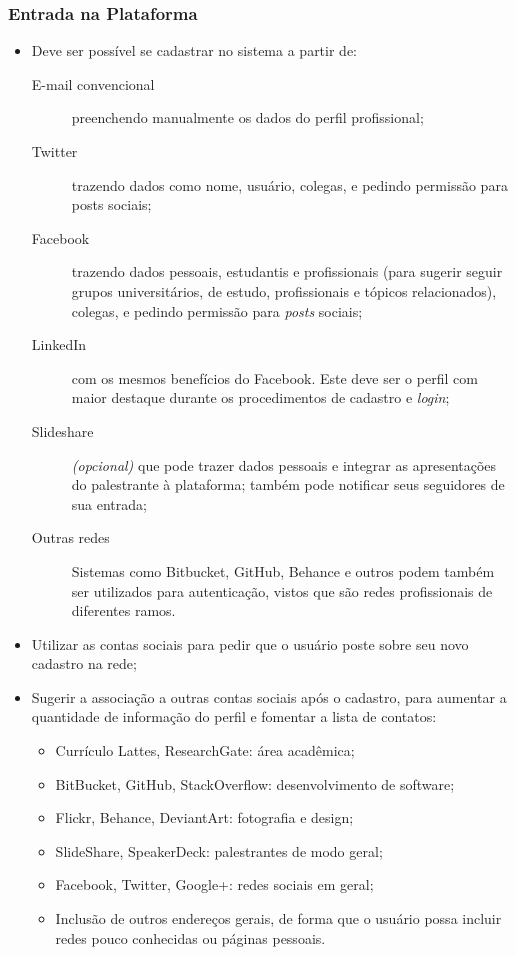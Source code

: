 \documentclass[12pt,a4paper,twoside,hyphens,english,brazil]{abntex2}
\begin{document}
\subsubsection*{Entrada na Plataforma}
\begin{itemize}
\item Deve ser possível se cadastrar no sistema a partir de:
	\begin{description} %
		\item[E-mail convencional] preenchendo manualmente os dados do perfil profissional;
		\item[Twitter] trazendo dados como nome, usuário, colegas, e pedindo permissão para posts sociais; %
		\item[Facebook] trazendo dados pessoais, estudantis e profissionais (para sugerir seguir grupos universitários, de estudo, profissionais e tópicos relacionados), colegas, e pedindo permissão para \emph{posts} sociais; %
		\item[LinkedIn] com os mesmos benefícios do Facebook. Este deve ser o perfil com maior destaque durante os procedimentos de cadastro e \emph{login};
		\item[Slideshare] \textit{(opcional)} que pode trazer dados pessoais e integrar as apresentações do palestrante à plataforma; também pode notificar seus seguidores de sua entrada;
		\item[Outras redes] Sistemas como Bitbucket, GitHub, Behance e outros podem também ser utilizados para autenticação, vistos que são redes profissionais de diferentes ramos.
	\end{description}
\item Utilizar as contas sociais para pedir que o usuário poste sobre seu novo cadastro na rede;
\item Sugerir a associação a outras contas sociais após o cadastro, para aumentar a quantidade de informação do perfil e fomentar a lista de contatos:
	\begin{itemize}[itemsep=-1ex]
		\item Currículo Lattes, ResearchGate: área acadêmica;
		\item BitBucket, GitHub, StackOverflow: desenvolvimento de software;
		\item Flickr, Behance, DeviantArt: fotografia e design;
		\item SlideShare, SpeakerDeck: palestrantes de modo geral;
		\item Facebook, Twitter, Google+: redes sociais em geral;
		\item Inclusão de outros endereços gerais, de forma que o usuário possa incluir redes pouco conhecidas ou páginas pessoais.
	\end{itemize}
\end{itemize}
\end{document}
